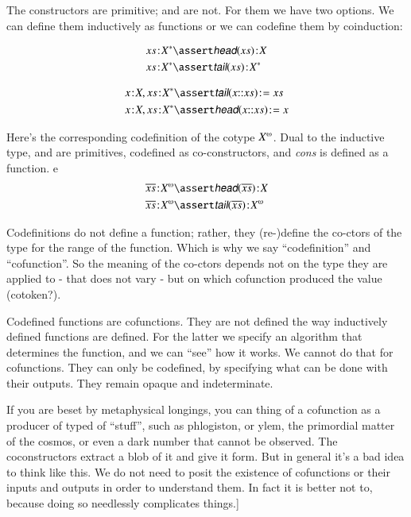 \documentclass{article}
\begin{document}
The constructors are primitive; \head{} and \tail{} are not. For them
we have two options. We can define them inductively as functions or we
can codefine them by coinduction:

\begin{align}
  \tj{\seq{x}}{\List{X}} & \linfer \tj{\head(\seq{x})}{X} \\
  \tj{\seq{x}}{\List{X}} & \linfer \tj{\tail(\seq{x})}{\List X}
\end{align}

\begin{align}
  \tj{x}{X},\tj{\seq{x}}{\List{X}} & \linfer \tj{\tail(x\cons{}\seq{x})} = \seq{x} \\
  \tj{x}{X},\tj{\seq{x}}{\List{X}} & \linfer \tj{\head(x\cons{}\seq{x})} = x
\end{align}

Here's the corresponding codefinition of the cotype \(\colist{X}\).
Dual to the inductive type, \head{} and \tail{} are primitives, codefined
as co-constructors, and \textit{cons} is defined as a function.
e
\begin{align}
  \tj{\coseq{x}}{\colist{X}} & \linfer \tj{\head(\coseq{x})}{X} \\
  \tj{\coseq{x}}{\colist{X}} & \linfer \tj{\tail(\coseq{x})}{\colist{X}}
\end{align}



Codefinitions do not define a function; rather, they (re-)define the
co-ctors of the type for the range of the function. Which is why we
say ``codefinition'' and ``cofunction''. So the meaning of the
co-ctors depends not on the type they are applied to - that does not
vary - but on which cofunction produced the value (cotoken?).

Codefined functions are cofunctions. They are not defined the way
inductively defined functions are defined. For the latter we specify
an algorithm that determines the function, and we can ``see'' how it
works. We cannot do that for cofunctions. They can only be codefined,
by specifying what can be done with their outputs. They remain opaque
and indeterminate.

If you are beset by metaphysical longings, you can thing of a
cofunction as a producer of typed of ``stuff'', such as phlogiston, or
ylem, the primordial matter of the cosmos, or even a dark number that
cannot be observed. The coconstructors extract a blob of it and give
it form. But in general it's a bad idea to think like this. We do not
need to posit the existence of cofunctions or their inputs and outputs
in order to understand them. In fact it is better not to, because doing so needlessly complicates things.]
\end{document}
